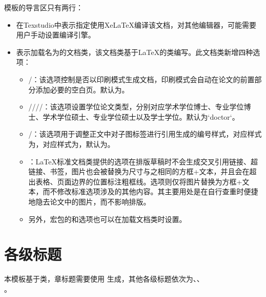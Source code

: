 \documentclass[print, promaster, vlined]{DissertUESTC}
\begin{document}
	模板的导言区只有两行：
	\begin{itemize}
		\item {}在Texstudio中表示指定使用XeLaTeX编译该文档，对其他编辑器，可能需要用户手动设置编译引擎。

		\item {}表示加载名为的文档类，该文档类基于LaTeX的类编写。此文档类新增四种选项：

		\begin{itemize}
			\item {}/：该选项控制是否以印刷模式生成文档，印刷模式会自动在论文的前置部分添加必要的空白页。默认为。

			\item {}////：该选项设置学位论文类型，分别对应学术学位博士、专业学位博士、学术学位硕士、专业学位硕士以及学士学位。默认为`doctor`。
   
			\item {}/：该选项用于调整正文中对子图标签进行引用生成的编号样式，对应样式为，对应样式为，默认为。
   
			\item {}：LaTeX标准文档类提供的选项在排版草稿时不会生成交叉引用链接、超链接、书签，图片也会被替换为尺寸与之相同的方框+文本，并且会在超出表格、页面边界的位置标注粗框线。选项则仅将图片替换为方框+文本，而不修改标准选项涉及的其他内容。其主要用处是在自行查重时便捷地隐去论文中的图片，而不影响排版。

			\item 另外，宏包的和选项也可以在加载文档类时设置。
		\end{itemize}
	\end{itemize}
	
	\section{各级标题}
	
	本模板基于类，章标题需要使用 生成，其他各级标题依次为、、\\ 。
	
\end{document}
